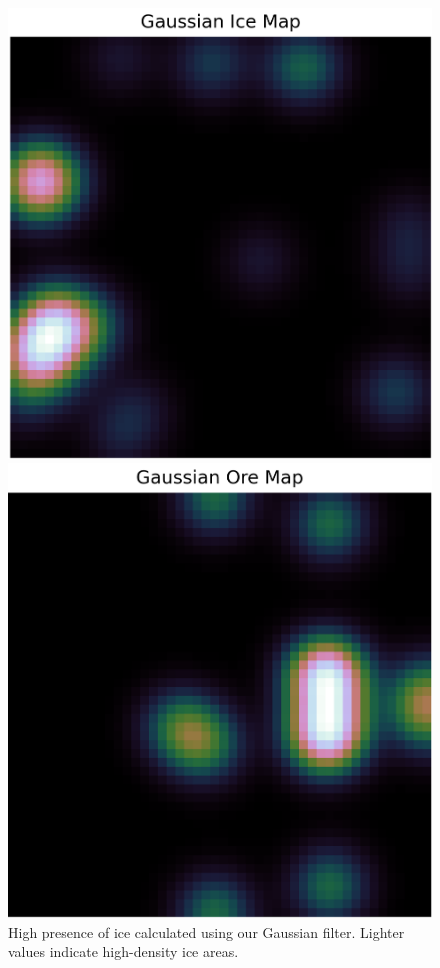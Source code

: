 \begin{figure}[htbp]
    \begin{minipage}{0.32\textwidth}
        \centering
        \includegraphics[width=\linewidth]{images/methods_mono/factory_placement/gaussian_ice_map.png}
        \captionsetup{justification=justified, singlelinecheck=false, width=1\linewidth, labelfont=bf} 
        \caption{High presence of ice calculated using our Gaussian filter. Lighter values indicate high-density ice areas.}
        \label{fig:gaussian-ice}
    \end{minipage}\hfill
    \begin{minipage}{0.32\textwidth}
        \centering
        \includegraphics[width=\linewidth]{images/methods_mono/factory_placement/gaussian_ore_map.png}

\end{minipage}
\end{figure}
